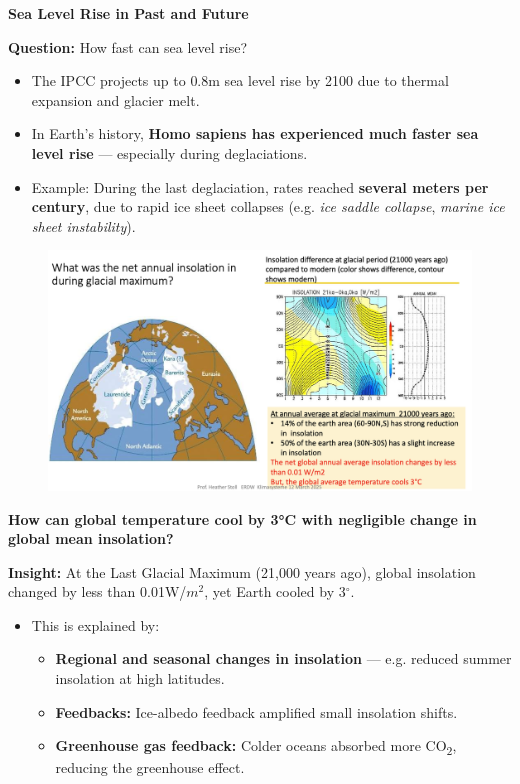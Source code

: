 \documentclass[fontsize=8pt, a4paper, landscape, fleqn]{scrartcl}
\renewcommand{\subsection}[1]{%
    \noindent\colorbox{subsectioncolor}{%
        \parbox{\dimexpr\columnwidth-2\fboxsep}{\color{white}\textbf{#1}}}%
    \vspace{0.5mm}%
}
\begin{document}
\begin{multicols*}{3}[\raggedcolumns]
\subsection{Sea Level Rise in Past and Future}

\textbf{Question:} How fast can sea level rise?

\begin{itemize}
    \item The IPCC projects up to {0.8}{m} sea level rise by 2100 due to thermal expansion and glacier melt.
    \item In Earth's history, \textbf{Homo sapiens has experienced much faster sea level rise} — especially during deglaciations.
    \item Example: During the last deglaciation, rates reached \textbf{several meters per century}, due to rapid ice sheet collapses (e.g. \textit{ice saddle collapse}, \textit{marine ice sheet instability}).
\end{itemize}
\begin{figure}[H]
    \centering
    \includegraphics[width=0.5\linewidth]{CS/img/Ice_annual_insulation.png}

\end{figure}
\subsection{How can global temperature cool by 3°C with negligible change in global mean insolation?}

\textbf{Insight:} At the Last Glacial Maximum (21,000 years ago), global insolation changed by less than {0.01}{W/$m^2$}, yet Earth cooled by {3}{$^\circ$}.

\begin{itemize}
    \item This is explained by:
    \begin{itemize}
        \item \textbf{Regional and seasonal changes in insolation} — e.g. reduced summer insolation at high latitudes.
        \item \textbf{Feedbacks:} Ice-albedo feedback amplified small insolation shifts.
        \item \textbf{Greenhouse gas feedback:} Colder oceans absorbed more CO\textsubscript{2}, reducing the greenhouse effect.
    \end{itemize}
\end{itemize}


\end{multicols*}
\end{document}
